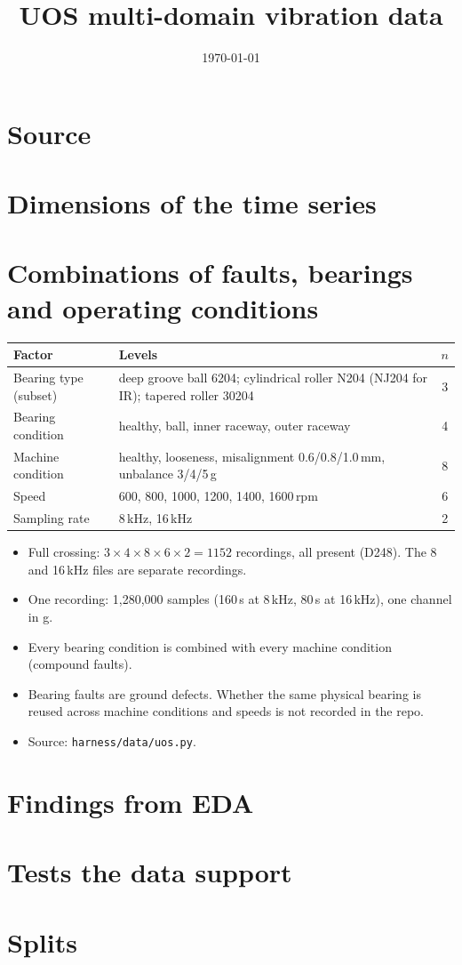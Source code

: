 \documentclass[11pt,a4paper]{article}
\title{UOS multi-domain vibration data}
\author{}
\date{\today}
\begin{document}
\maketitle

\section{Source}

\section{Dimensions of the time series}

\section{Combinations of faults, bearings and operating conditions}

\begin{table}[h]
\centering
\small
\begin{tabular}{lp{9cm}c}
\toprule
Factor & Levels & $n$ \\
\midrule
Bearing type (subset) & deep groove ball 6204; cylindrical roller N204 (NJ204 for IR); tapered roller 30204 & 3 \\
Bearing condition     & healthy, ball, inner raceway, outer raceway & 4 \\
Machine condition     & healthy, looseness, misalignment 0.6/0.8/1.0\,mm, unbalance 3/4/5\,g & 8 \\
Speed                 & 600, 800, 1000, 1200, 1400, 1600\,rpm & 6 \\
Sampling rate         & 8\,kHz, 16\,kHz & 2 \\
\bottomrule
\end{tabular}
\end{table}

\begin{itemize}
  \item Full crossing: $3 \times 4 \times 8 \times 6 \times 2 = 1152$ recordings, all present
        (D248). The 8 and 16\,kHz files are separate recordings.
  \item One recording: 1,280,000 samples (160\,s at 8\,kHz, 80\,s at 16\,kHz), one channel in g.
  \item Every bearing condition is combined with every machine condition (compound faults).
  \item Bearing faults are ground defects. Whether the same physical bearing is reused across
        machine conditions and speeds is not recorded in the repo.
  \item Source: \texttt{harness/data/uos.py}.
\end{itemize}

\section{Findings from EDA}

\section{Tests the data support}

\section{Splits}
\end{document}

